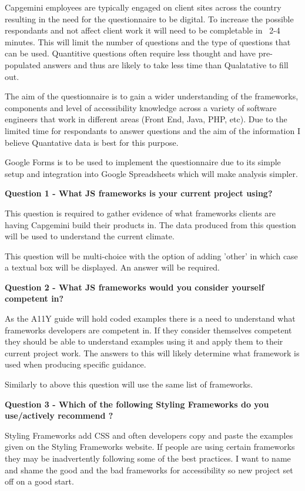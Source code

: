 Capgemini employees are typically engaged on client sites across the country
resulting in the need for the questionnaire to be digital. To increase
the possible respondants and not affect client work it will need to be
completable in ~2-4 minutes. This will limit the number of questions and the
type of questions that can be used. Quantitive questions often require less
thought and have pre-populated answers and thus are likely to take less time
than Qualatative to fill out.

The aim of the questionnaire is to gain a wider understanding of the
frameworks, components and level of accessibility knowledge across a variety
of software engineers that work in different areas (Front End, Java, PHP,
etc). Due to the limited time for respondants to answer questions and the
aim of the information I believe Quantative data is best for this purpose.

Google Forms is to be used to implement the questionnaire due to its simple
setup and integration into Google Spreadsheets which will make analysis
simpler.

\textbf{Question 1 - What JS frameworks is your current project
using?}

This question is required to gather evidence of what frameworks clients are
having Capgemini build their products in. The data produced from this
question will be used to understand the current climate.

This question will be multi-choice with the option of adding 'other' in which
case a textual box will be displayed. An answer will be required.

\textbf{Question 2 - What JS frameworks would you consider yourself
competent in?}

As the A11Y guide will hold coded examples there is a need to understand what
frameworks developers are competent in. If they consider themselves competent
they should be able to understand examples using it and apply them to their
current project work. The answers to this will likely determine what
framework is used when producing specific guidance.

Similarly to above this question will use the same list of frameworks.

\textbf{Question 3 - Which of the following Styling Frameworks do you
use/actively recommend ?}

Styling Frameworks add CSS and often developers copy and paste the examples
given on the Styling Frameworks website. If people are using certain
frameworks they may be inadvertently following some of the best practices. I
want to name and shame the good and the bad frameworks for accessibility so
new project set off on a good start.

